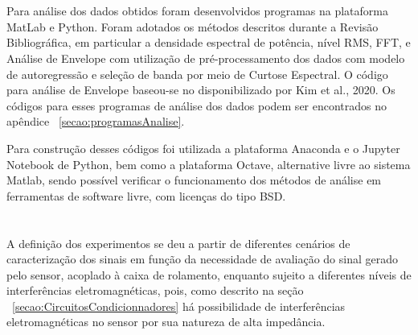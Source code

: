 \documentclass[
	12pt,				
	oneside,			
	a4paper,			
	english,			
	brazil,			
	]{abntex2ppgsi}
\begin{document}
\section{}

Para análise dos dados obtidos foram desenvolvidos programas na plataforma MatLab e Python. Foram adotados os métodos descritos durante a Revisão Bibliográfica, em particular a densidade espectral de potência, nível RMS, FFT, e Análise de Envelope com utilização de pré-processamento dos dados com modelo de autoregressão e seleção de banda por meio de Curtose Espectral. O código para análise de Envelope baseou-se no disponibilizado por Kim et al., 2020. Os códigos para esses programas de análise dos dados podem ser encontrados no apêndice ~\ref{secao:programasAnalise}.

Para construção desses códigos foi utilizada a plataforma Anaconda e o Jupyter Notebook de Python, bem como a plataforma Octave, alternative livre ao sistema Matlab, sendo possível verificar o funcionamento dos métodos de análise em ferramentas de software livre, com licenças do tipo BSD. 

\section{}

A definição dos experimentos se deu a partir de diferentes cenários de caracterização dos sinais em função da necessidade de avaliação do sinal gerado pelo sensor, acoplado à caixa de rolamento, enquanto sujeito a diferentes níveis de interferências eletromagnéticas, pois, como descrito na seção ~\ref{secao:CircuitosCondicionnadores} há possibilidade de interferências eletromagnéticas no sensor por sua natureza de alta impedância. 


\end{document}

